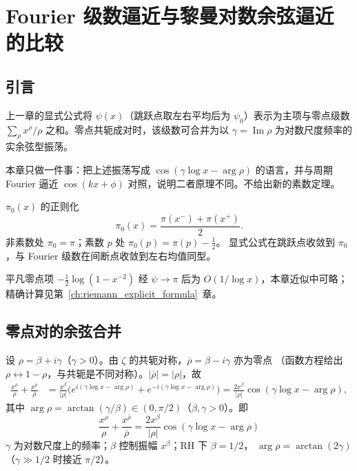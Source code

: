 
\chapter{Fourier 级数逼近与黎曼对数余弦逼近的比较}\label{ch:fourier_vs_riemann}

\section{引言}\label{sec:fourier_vs_riemann_intro}

上一章的显式公式将 $\psi(x)$（跳跃点取左右平均后为 $\psi_0$）表示为主项与零点级数
$\sum_{\rho}x^{\rho}/\rho$ 之和。零点共轭成对时，该级数可合并为以 $\gamma=\operatorname{Im}\rho$
为对数尺度频率的实余弦型振荡。

本章只做一件事：把上述振荡写成 $\cos(\gamma\log x-\arg\rho)$ 的语言，并与周期 Fourier 逼近
$\cos(kx+\phi)$ 对照，说明二者原理不同。不给出新的素数定理。

\begin{definition}{$\pi_0(x)$ 的正则化}{}\label{def:pi0}
\[
\pi_0(x)=\frac{\pi(x^-)+\pi(x^+)}{2}.
\]
非素数处 $\pi_0=\pi$；素数 $p$ 处 $\pi_0(p)=\pi(p)-\frac12$。
显式公式在跳跃点收敛到 $\pi_0$，与 Fourier 级数在间断点收敛到左右均值同型。
\end{definition}

平凡零点项 $-\frac12\log(1-x^{-2})$ 经 $\psi\to\pi$ 后为 $O(1/\log x)$，本章近似中可略；
精确计算见第~\ref{ch:riemann_explicit_formula}~章。

\section{零点对的余弦合并}

设 $\rho=\beta+i\gamma$（$\gamma>0$）。由 $\zeta$ 的共轭对称，$\overline{\rho}=\beta-i\gamma$ 亦为零点
（函数方程给出 $\rho\leftrightarrow 1-\rho$，与共轭是不同对称）。$|\overline{\rho}|=|\rho|$，故
\begin{align*}
\frac{x^{\rho}}{\rho}+\frac{x^{\overline{\rho}}}{\overline{\rho}}
&= \frac{x^{\beta}}{|\rho|}
   \bigl(e^{i(\gamma\log x-\arg\rho)}+e^{-i(\gamma\log x-\arg\rho)}\bigr)
= \frac{2x^{\beta}}{|\rho|}\cos(\gamma\log x-\arg\rho),
\end{align*}
其中 $\arg\rho=\arctan(\gamma/\beta)\in(0,\pi/2)$（$\beta,\gamma>0$）。即
\begin{equation}
\boxed{\frac{x^{\rho}}{\rho}+\frac{x^{\overline{\rho}}}{\overline{\rho}}
=\frac{2x^{\beta}}{|\rho|}\cos(\gamma\log x-\arg\rho)}
\label{eq:cosine_pair}
\end{equation}
$\gamma$ 为对数尺度上的频率；$\beta$ 控制振幅 $x^{\beta}$；RH 下 $\beta=1/2$，
$\arg\rho=\arctan(2\gamma)$（$\gamma\gg 1/2$ 时接近 $\pi/2$）。


